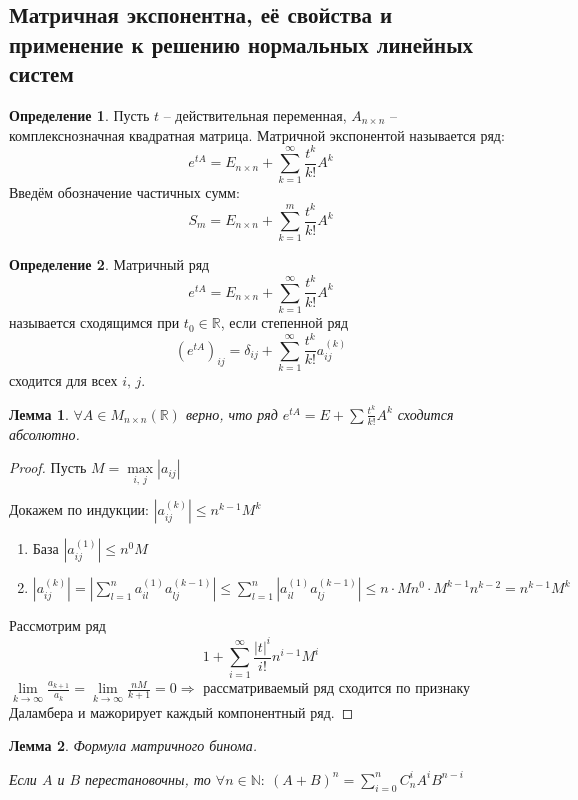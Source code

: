\documentclass[a4paper,12pt]{article}
\renewcommand{\leq}{\ensuremath{\leqslant}}
\theoremstyle{plain}
\newtheorem{lemma}{Лемма}[section]
\theoremstyle{definition}
\newtheorem{definition}{Определение}[section]
\theoremstyle{remark}
\begin{document}
\subsection{Матричная экспонентна, её свойства и применение к решению нормальных линейных систем}
\begin{definition}
	Пусть $t$ -- действительная переменная, $A_{n \times n}$ -- комплекснозначная квадратная матрица. Матричной экспонентой называется ряд:
	\[e^{tA} = E_{n \times n} + \sum_{k = 1}^\infty \frac{t^k}{k!}A^k\]
	Введём обозначение частичных сумм:
	\[S_m = E_{n \times n} + \sum_{k = 1}^m \frac{t^k}{k!}A^k\]
\end{definition}

\begin{definition}
	Матричный ряд
	\[e^{tA} = E_{n \times n} + \sum_{k = 1}^\infty \frac{t^k}{k!}A^k\]
	называется сходящимся при $t_0 \in \mathbb{R}$, если степенной ряд
	\[(e^{tA})_{ij} = \delta_{ij} + \sum_{k = 1}^\infty \frac{t^k}{k!}a_{ij}^{(k)}\]
	сходится для всех $i,\,j$.
\end{definition}

\begin{lemma}
	$\forall A \in M_{n \times n}(\mathbb{R})$ верно, что ряд $e^{tA} = E + \sum \frac{t^k}{k!}A^k$ сходится абсолютно.
\end{lemma}

\begin{proof}
	Пусть $M = \max\limits_{i,\,j}|a_{ij}|$

	Докажем по индукции: $|a_{ij}^{(k)}| \leq n^{k-1}M^k$
	\begin{enumerate}
		\item База $|a_{ij}^{(1)}| \leq n^0M$
		\item $|a_{ij}^{(k)}| = |\sum_{l = 1}^n a_{il}^{(1)}a_{lj}^{(k-1)}| \leq \sum_{l = 1}^n |a_{il}^{(1)}a_{lj}^{(k-1)}| \leq n\cdot Mn^0\cdot M^{k - 1}n^{k-2} = n^{k-1}M^k$
	\end{enumerate}
	Рассмотрим ряд
	\[1 + \sum_{i = 1}^\infty \frac{|t|^i}{i!}n^{i - 1}M^i\]
	$\lim\limits_{k \to \infty} \frac{a_{k + 1}}{a_k} = \lim\limits_{k \to \infty} \frac{nM}{k + 1} = 0 \Rightarrow$ рассматриваемый ряд сходится по признаку Даламбера и мажорирует каждый компонентный ряд.
\end{proof}

\begin{lemma}
	Формула матричного бинома.

	Если $A$ и $B$ перестановочны, то $\forall n \in \mathbb{N}:\: (A + B)^n = \sum_{i = 0}^n C_n^iA^iB^{n - i}$
\end{lemma}
\end{document}

